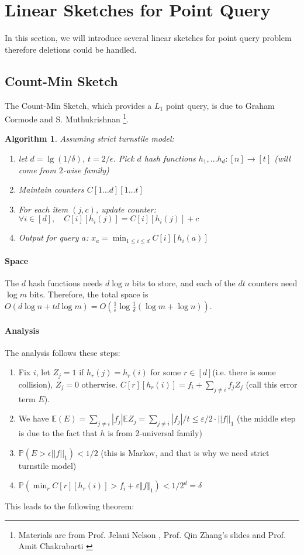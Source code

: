 \documentclass[11pt]{article}
\theoremstyle{plain}
\newtheorem{algorithm}{Algorithm}[section]
\begin{document}
\section{Linear Sketches for Point Query}

In this section, we will introduce several linear sketches for point query problem 
therefore deletions could be handled. 

\subsection{Count-Min Sketch}
The Count-Min Sketch, which provides a $L_1$ point query, is due to	Graham 
Cormode and S. Muthukrishnan \cite{Cormode05}\footnote{Materials are from 
	Prof. Jelani Nelson  \cite{Nel2015-web}, Prof. Qin Zhang's 
	slides  \cite{zhang2017-slides} and Prof. Amit 
	Chakrabarti  \cite{Cha2015-notes}}. 

\begin{algorithm}
	\label{al:countmin}
Assuming strict turnstile model:
\begin{enumerate}
	\item let $d = \lg(1/\delta)$, $t=2/\epsilon$. Pick $d$ hash functions 
	$h_1,...h_d: [n]\rightarrow[t]$ (will come from $2$-wise family)
	\item Maintain counters $C[1\dots d][1\dots t]$
	\item For each item $(j,c)$, update counter: $\forall i\in [d], \quad 
	C[i][h_i(j)]=C[i][h_i(j)]+c$
	\item Output for query $a$: $x_a=\min_{1\leq i \leq d}C[i][h_i(a)]$
\end{enumerate}
\end{algorithm}

\paragraph{Space}
The $d$ hash functions needs $d\log n$ bits to store, and each of the $dt$ 
counters need $\log m$ bits. Therefore, the total space is $O(d\log n + td \log 
m)=O(\frac{1}{\epsilon}\log \frac{1}{\delta}(\log m +\log n))$. 

\paragraph{Analysis}The analysis follows these steps: 
\begin{enumerate} 
	\item Fix $i$, let $Z_j = 1$ if $h_r(j)=h_r(i)$ for some $r\in 
	[d]$(i.e. there is some collision), $Z_j=0$ otherwise. $C[r][h_r(i)]=f_i + 
	\sum_{j\neq i} f_jZ_j$ (call this error term $E$). 
	\item We have $\mathbb{E}(E)=\sum_{j\neq i}|f_j|\mathbb{E}Z_j=\sum_{j\neq 
	i}|f_j|/t\leq\varepsilon/2\cdot||f||_1$ (the middle step is due to the fact that 
	$h$ is from 2-universal family)
	\item $\mathbb{P}(E>\epsilon||f||_1)< 1/2$ (this is Markov, and that is why 
	we need strict turnstile model)
	\item $\mathbb{P}(\min_r C[r][h_r(i)]> f_i + \varepsilon\Vert 
	f\Vert_1)<1/2^d=\delta$
\end{enumerate}
This leads to the following theorem:
\end{document}
